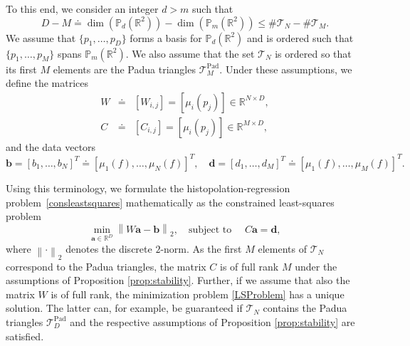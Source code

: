 \documentclass{svjour3}
\newcommand{\T}{\mathcal{T}}
\renewcommand{\P}{\mathbb{P}} %
\begin{document}

To this end, we consider an integer $ d > m $ such that 
\begin{equation*}\label{DeM}
D-M \doteq \dim\left(\P_d\left(\mathbb{R}^2\right)\right) - \dim \left(\P_m\left(\mathbb{R}^2\right) \right) \leq \# \mathcal{T}_N - \# \mathcal{T}_M.    
\end{equation*}
We assume that $ \{ p_1, \ldots, p_D \} $ forms a basis for $\P_d \left(\mathbb{R}^2\right) $ and is ordered such that $ \{ p_1, \ldots, p_M \} $ spans $ \P_m \left(\mathbb{R}^2\right) $. 
We also assume that the set $\T_N$ is ordered so that its first $M$ elements are the Padua triangles $\T_M^{\mathrm{Pad}}$. Under these assumptions, we define the matrices 
\begin{eqnarray} \label{eq:rectVanderm}
W&\doteq&\left[W_{i,j}\right]=\left[\mu_i\left(p_j\right)\right]\in\mathbb{R}^{N \times D}, \\ C&\doteq&\left[C_{i,j}\right]=\left[\mu_i\left(p_j\right)\right]\in\mathbb{R}^{M \times D},
\end{eqnarray}
and the data vectors 
\begin{equation*}\label{bandd}
\boldsymbol{b}=\left[b_1,\dots,b_N\right]^T \doteq \left[\mu_1(f),\dots,\mu_{N}(f)\right]^T, \quad \boldsymbol{d}=\left[d_1,\dots,d_M\right]^T \doteq \left[\mu_1(f),\dots,\mu_M (f)\right]^T.
\end{equation*}

Using this terminology, we formulate the histopolation-regression problem~\eqref{consleastsquares} mathematically 
as the constrained least-squares problem
\begin{equation} \label{LSProblem} \min_{\boldsymbol{a}\in \mathbb{R}^{D}}\left\lVert W\boldsymbol{a}-\boldsymbol{b}\right\rVert_2, \quad \text{subject to } \quad C \boldsymbol{a} = \boldsymbol{d},
\end{equation} 
where $\left\lVert \cdot\right\rVert_2$ denotes the discrete $2$-norm. As the first $M$ elements of $\T_N$ correspond to the Padua triangles, the matrix $C$ is of full rank $M$ under the assumptions of Proposition \ref{prop:stability}. Further, if we assume that also the matrix $W$ is of full rank, the minimization problem \eqref{LSProblem} has a unique solution. The latter can, for example, be guaranteed if $\T_N$ contains the Padua triangles $\T_D^{\mathrm{Pad}}$ and the respective assumptions of Proposition \ref{prop:stability} are satisfied. 
\end{document}
